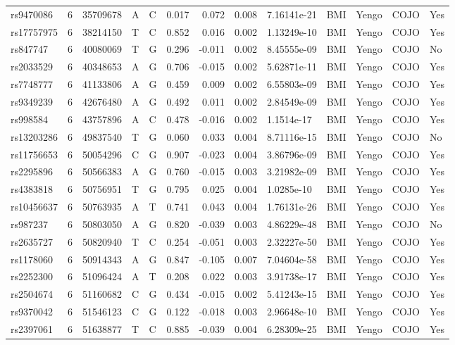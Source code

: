 \documentclass[11pt,twoside]{bristolthesis}
\begin{document}
\begin{longtable}[t]{lrlllrrrlllll}
rs9470086 & 6 & 35709678 & A & C & 0.017 & 0.072 & 0.008 & 7.16141e-21 & BMI & Yengo & COJO & Yes\\
rs17757975 & 6 & 38214150 & T & C & 0.852 & 0.016 & 0.002 & 1.13249e-10 & BMI & Yengo & COJO & Yes\\
\addlinespace
rs847747 & 6 & 40080069 & T & G & 0.296 & -0.011 & 0.002 & 8.45555e-09 & BMI & Yengo & COJO & No\\
rs2033529 & 6 & 40348653 & A & G & 0.706 & -0.015 & 0.002 & 5.62871e-11 & BMI & Yengo & COJO & Yes\\
rs7748777 & 6 & 41133806 & A & G & 0.459 & 0.009 & 0.002 & 6.55803e-09 & BMI & Yengo & COJO & Yes\\
rs9349239 & 6 & 42676480 & A & G & 0.492 & 0.011 & 0.002 & 2.84549e-09 & BMI & Yengo & COJO & Yes\\
rs998584 & 6 & 43757896 & A & C & 0.478 & -0.016 & 0.002 & 1.1514e-17 & BMI & Yengo & COJO & Yes\\
\addlinespace
rs13203286 & 6 & 49837540 & T & G & 0.060 & 0.033 & 0.004 & 8.71116e-15 & BMI & Yengo & COJO & No\\
rs11756653 & 6 & 50054296 & C & G & 0.907 & -0.023 & 0.004 & 3.86796e-09 & BMI & Yengo & COJO & Yes\\
rs2295896 & 6 & 50566383 & A & G & 0.760 & -0.015 & 0.003 & 3.21982e-09 & BMI & Yengo & COJO & Yes\\
rs4383818 & 6 & 50756951 & T & G & 0.795 & 0.025 & 0.004 & 1.0285e-10 & BMI & Yengo & COJO & Yes\\
rs10456637 & 6 & 50763935 & A & T & 0.741 & 0.043 & 0.004 & 1.76131e-26 & BMI & Yengo & COJO & Yes\\
\addlinespace
rs987237 & 6 & 50803050 & A & G & 0.820 & -0.039 & 0.003 & 4.86229e-48 & BMI & Yengo & COJO & No\\
rs2635727 & 6 & 50820940 & T & C & 0.254 & -0.051 & 0.003 & 2.32227e-50 & BMI & Yengo & COJO & Yes\\
rs1178060 & 6 & 50914343 & A & G & 0.847 & -0.105 & 0.007 & 7.04604e-58 & BMI & Yengo & COJO & Yes\\
rs2252300 & 6 & 51096424 & A & T & 0.208 & 0.022 & 0.003 & 3.91738e-17 & BMI & Yengo & COJO & Yes\\
rs2504674 & 6 & 51160682 & C & G & 0.434 & -0.015 & 0.002 & 5.41243e-15 & BMI & Yengo & COJO & Yes\\
\addlinespace
rs9370042 & 6 & 51546123 & C & G & 0.122 & -0.018 & 0.003 & 2.96648e-10 & BMI & Yengo & COJO & Yes\\
rs2397061 & 6 & 51638877 & T & C & 0.885 & -0.039 & 0.004 & 6.28309e-25 & BMI & Yengo & COJO & Yes\\

\end{longtable}
\end{document}
